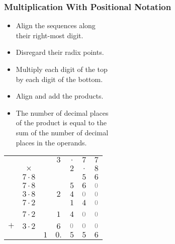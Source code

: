 \begin{frame}

\frametitle{Multiplication With Positional Notation}

\vspace{\fill}

\begin{minipage}{0.7\textwidth}

\begin{itemize}

\item Align the sequences along \\ their right-most digit.

\item Disregard their radix points.

\item Multiply each digit of the top \\ by each digit of the bottom.

\item Align and add the products.

\item The number of decimal places \\ of the product is equal to the \\ sum of
the number of decimal \\ places in the operands.

\end{itemize}

\end{minipage}%
\begin{minipage}[t]{0.3\textwidth}

{\setlength{\tabcolsep}{1pt}
\begin{tabular}{ccccccc}
&          && $3$ & $.$ & $7$ & $7$  \\
&$\times$  && &   $2$ & $.$ & $8$  \\ \hline
&{\scriptsize $7\cdot 8$} && & & $5$ & $6$ \\
&{\scriptsize $7\cdot 8$} && & $5$ & $6$ & ${\color{gray}0}$ \\
&{\scriptsize $3\cdot 8$} && $2$ & $4$ & ${\color{gray}0}$ & ${\color{gray}0}$ \\
&{\scriptsize $7\cdot 2$} && & $1$ & $4$ & ${\color{gray}0}$ \\\
&{\scriptsize $7\cdot 2$} && $1$ & $4$ & ${\color{gray}0}$ & ${\color{gray}0}$ \\
$+$ &{\scriptsize $3\cdot 2$} && $6$ & ${\color{gray}0}$ & ${\color{gray}0}$ & ${\color{gray}0}$ \\
\hline
&& $1$ & $0.$ & $5$ & $5$ & $6$
\end{tabular}
}

\end{minipage}

\vspace{\fill}

\end{frame}
